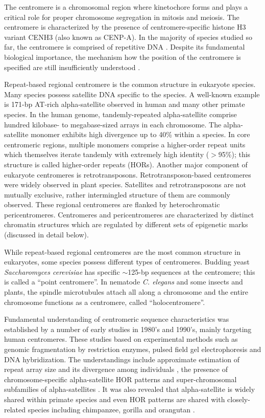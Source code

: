 The centromere is a chromosomal region where kinetochore forms and plays a critical role for proper chromosome segregation in mitosis and meiosis. The centromere is characterized by the presence of centromere-specific histone H3 variant CENH3 (also known as CENP-A). In the majority of species studied so far, the centromere is comprised of repetitive DNA \cite{Plohl2014}. Despite its fundamental biological importance, the mechanism how the position of the centromere is specified are still insufficiently understood \cite{McKinley2016}.

Repeat-based regional centromere is the common structure in eukaryote species. Many species possess satellite DNA specific to the species. A well-known example is 171-bp AT-rich alpha-satellite observed in human and many other primate species. In the human genome, tandemly-repeated alpha-satellite comprise hundred kilobase- to megabase-sized arrays in each chromosome. The alpha-satellite monomer exhibits high divergence up to 40\% within a species. In core centromeric regions, multiple monomers comprise a higher-order repeat units which themselves iterate tandemly with extremely high identity ($>$95\%); this structure is called higher-order repeats (HORs). Another major component of eukaryote centromeres is retrotransposons. Retrotransposon-based centromeres were widely observed in plant species. Satellites and retrotransposons are not mutually exclusive, rather intermingled structure of them are commonly observed. These regional centromeres are flanked by heterochromatic pericentromeres. Centromeres and pericentromeres are characterized by distinct chromatin structures which are regulated by different sets of epigenetic marks (discussed in detail below).

While repeat-based regional centromeres are the most common structure in eukaryotes, some species possess different types of centromeres. Budding yeast \textit{Saccharomyces cerevisiae} has specific $\sim$125-bp sequences at the centromere; this is called a ``point centromere''. In nematode \textit{C. elegans} and some insects and plants, the spindle microtubules attach all along a chromosome and the entire chromosome functions as a centromere, called ``holocentromere''.


Fundamental understanding of centromeric sequence characteristics was established by a number of early studies in 1980's and 1990's, mainly targeting human centromeres. These studies based on experimental methods such as genomic fragmentation by restriction enzymes, pulsed field gel electrophoresis and DNA hybridization. The understandings include approximate estimation of repeat array size and its divergence among individuals \cite{Oakey1990}, the presence of chromosome-specific alpha-satellite HOR patterns \cite{Willard1987} and super-chromosomal subfamilies of alpha-satellites \cite{Alexandrov2001}. It was also revealed that alpha-satellite is widely shared within primate species and even HOR patterns are shared with closely-related species including chimpanzee, gorilla and orangutan \cite{Willard1991}.


